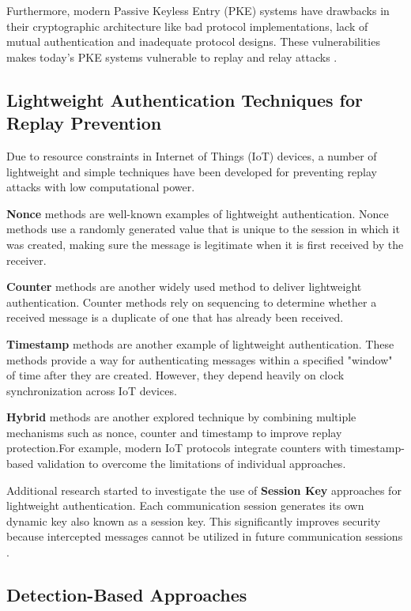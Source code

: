 \documentclass[a4paper,man,12pt]{article}
\begin{document}
Furthermore, modern Passive Keyless Entry (PKE) systems have drawbacks in their cryptographic architecture like bad protocol implementations, lack of mutual authentication and inadequate protocol designs. These vulnerabilities makes today's PKE systems vulnerable to replay and relay attacks \parencite{005}.

\subsection{Lightweight Authentication Techniques for Replay Prevention}

Due to resource constraints in Internet of Things (IoT) devices, a number of lightweight and simple techniques have been developed for preventing replay attacks with low computational power.\bigbreak 


\textbf{Nonce} methods are well-known examples of lightweight authentication. Nonce methods use a randomly generated value that is unique to the session in which it was created, making sure the message is legitimate when it is first received by the receiver.\bigbreak


\textbf{Counter} methods are another widely used method to deliver lightweight authentication. Counter methods rely on sequencing to determine whether a received message is a duplicate of one that has already been received.\bigbreak 

\textbf{Timestamp} methods are another example of lightweight authentication. These methods provide a way for authenticating messages within a specified "window" of time after they are created. However, they depend heavily on clock synchronization across IoT devices.\bigbreak

\textbf{Hybrid} methods are another explored technique by combining multiple mechanisms such as nonce, counter and timestamp to improve replay protection.For example, modern IoT protocols integrate counters with timestamp-based validation to overcome the limitations of individual approaches\parencite{005B}. \bigbreak

Additional research started to investigate the use of \textbf{Session Key} approaches for lightweight authentication. Each communication session generates its own dynamic key also known as a session key. This significantly improves security because intercepted messages cannot be utilized in future communication sessions \parencite{006}.

\subsection{Detection-Based Approaches}
\end{document}

